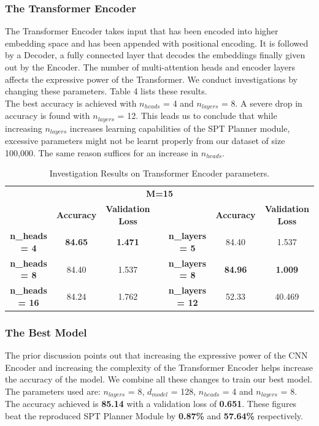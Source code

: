 \subsubsection{The Transformer Encoder}
The Transformer Encoder takes input that has been encoded into higher embedding space and has been appended with positional encoding. It is followed by a Decoder, a fully connected layer that decodes the embeddings finally given out by the Encoder. The number of multi-attention heads and encoder layers affects the expressive power of the Transformer. We conduct investigations by changing these parameters. Table 4 lists these results.\\ 
The best accuracy is achieved with $n_{heads}$ = 4 and $n_{layers}$ = 8. A severe drop in accuracy is found with $n_{layers}$ = 12. This leads us to conclude that while increasing $n_{layers}$ increases learning capabilities of the SPT Planner module, excessive parameters might not be learnt properly from our dataset of size 100,000. The same reason suffices for an increase in $n_{heads}$.
\begin{table}[]
\begin{center}
\begin{tabular}{@{}ccccccc@{}}
\multicolumn{7}{c}{\textbf{M=15}}                                                                                \\ 
              & \textbf{Accuracy}       & \textbf{Validation Loss} &  &                & \textbf{Accuracy}       & \textbf{Validation Loss} \\  
\textbf{n\_heads = 4}  & \textbf{84.65} & \textbf{1.471}  &  & \textbf{n\_layers = 5}  & 84.40          & 1.537           \\
\textbf{n\_heads = 8}  & 84.40          & 1.537           &  & \textbf{n\_layers = 8}  & \textbf{84.96} & \textbf{1.009}  \\
\textbf{n\_heads = 16} & 84.24          & 1.762           &  & \textbf{n\_layers = 12} & 52.33          & 40.469          \\ 
\end{tabular}
\end{center}
\caption{Investigation Results on Transformer Encoder parameters.}
\end{table}

\subsubsection{The Best Model}
The prior discussion points out that increasing the expressive power of the CNN Encoder and increasing the complexity of the Transformer Encoder helps increase the accuracy of the model. We combine all these changes to train our best model. \\  
The parameters used are: $n_{layers}$ = 8, $d_{model}$ = 128, $n_{heads}$ = 4 and $n_{layers}$ = 8. The accuracy achieved is \textbf{85.14} with a validation loss of\textbf{ 0.651}. These figures beat the reproduced SPT Planner Module by \textbf{0.87\%} and \textbf{57.64\%} respectively. 

